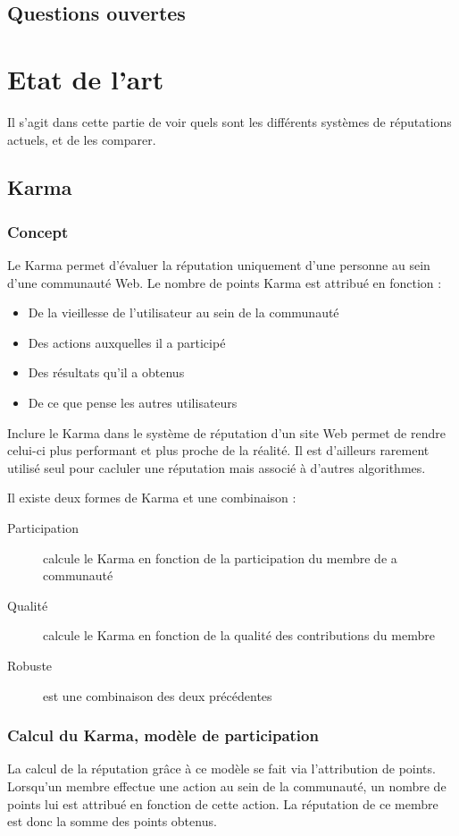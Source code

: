 \documentclass[a4paper, 11pt]{article} %
\begin{document}
\subsection{Questions ouvertes}

\section{Etat de l'art}
Il s'agit dans cette partie de voir quels sont les différents systèmes de réputations actuels, et de les comparer.


\subsection{Karma}
\subsubsection{Concept}
Le Karma permet d'évaluer la réputation uniquement d'une personne au sein d'une communauté Web. Le nombre de points Karma est attribué en fonction :
\begin{itemize}
	\item De la vieillesse de l'utilisateur au sein de la communauté
	\item Des actions auxquelles il a participé
	\item Des résultats qu'il a obtenus
	\item De ce que pense les autres utilisateurs
\end{itemize}
Inclure le Karma dans le système de réputation d'un site Web permet de rendre celui-ci plus performant et plus proche de la réalité. Il est d'ailleurs rarement utilisé seul pour cacluler une réputation mais associé à d'autres algorithmes.

Il existe deux formes de Karma et une combinaison :
\begin{description}
	\item[Participation] calcule le Karma en fonction de la participation du membre de a communauté
	\item[Qualité] calcule le Karma en fonction de la qualité des contributions du membre
	\item[Robuste] est une combinaison des deux précédentes
\end{description}

\subsubsection{Calcul du Karma, modèle de participation}
La calcul de la réputation grâce à ce modèle se fait via l'attribution de points. Lorsqu'un membre effectue une action au sein de la communauté, un nombre de points lui est attribué en fonction de cette action. La réputation de ce membre est donc la somme des points obtenus.
\end{document}
